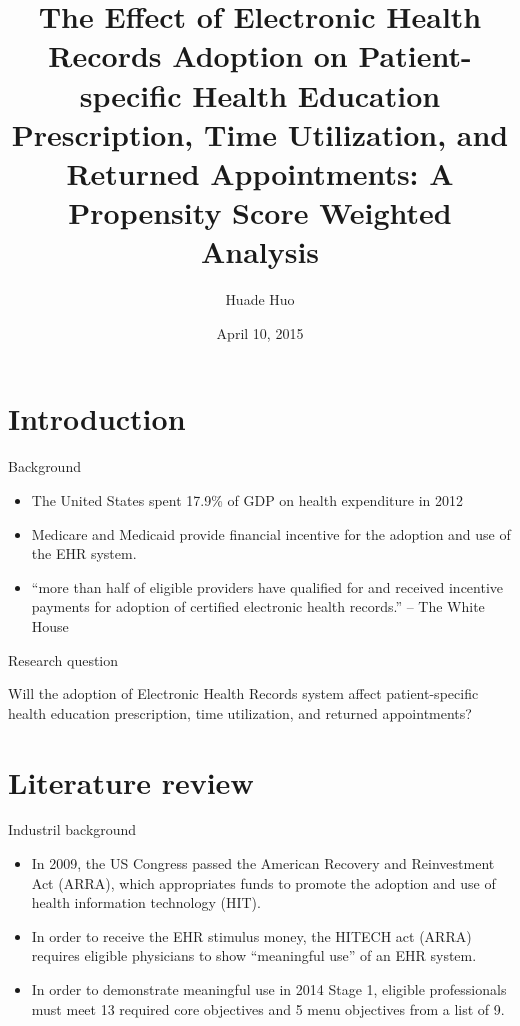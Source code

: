 \documentclass[10pt, compress]{beamer}
\title{The Effect of Electronic Health Records Adoption
on Patient-specific Health Education Prescription, Time Utilization, and Returned Appointments: A Propensity Score Weighted Analysis}
\subtitle{}
\date{April 10, 2015}
\author{Huade Huo}
\institute{Georgetown University}
\begin{document}
\maketitle
\section{Introduction}
\begin{frame}{Background}

     
      \begin{itemize}
        \item The United States spent 17.9\% of GDP on health expenditure in 2012 
        \item Medicare and Medicaid provide financial incentive for the adoption and use of the EHR system. 
        \item ``more than half of eligible providers have qualified for and received incentive payments for adoption of certified electronic health records.'' -- The White House
      \end{itemize}

\end{frame}

\begin{frame}{Research question}

     
Will the adoption of Electronic Health Records system affect
patient-specific health education prescription, time utilization, and returned appointments?

\end{frame}

\section{Literature review}
\begin{frame}{Industril background}

     
      \begin{itemize}
        \item In 2009, the US Congress passed the American Recovery and Reinvestment Act (ARRA), which appropriates funds to promote the adoption and use of health information technology (HIT). 
        \item In order to receive the EHR stimulus money, the HITECH act (ARRA) requires eligible physicians to show ``meaningful use'' of an EHR system. 
        \item In order to demonstrate meaningful use in 2014 Stage 1, eligible professionals must meet 13 required core objectives and 5 menu objectives from a list of 9.
      \end{itemize}

\end{frame}
\end{document}
